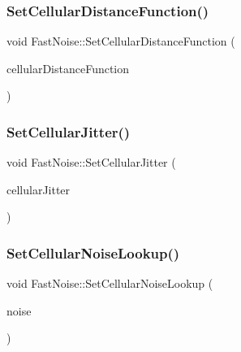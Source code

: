 \mbox{\label{class_fast_noise_aa47dea942e8c687892b5bad6d652883f}} 
\subsubsection{\texorpdfstring{Set\+Cellular\+Distance\+Function()}{SetCellularDistanceFunction()}}
{\footnotesize\ttfamily void Fast\+Noise\+::\+Set\+Cellular\+Distance\+Function (\begin{DoxyParamCaption}\item[{\mbox{\hyperlink{class_fast_noise_a457e58d0da6dbe486deb5a21a3db52bf}{Cellular\+Distance\+Function}}}]{cellular\+Distance\+Function }\end{DoxyParamCaption})\hspace{0.3cm}{\ttfamily [inline]}}

\mbox{\label{class_fast_noise_a99ea21716db492c179b4d632594a430c}} 
\subsubsection{\texorpdfstring{Set\+Cellular\+Jitter()}{SetCellularJitter()}}
{\footnotesize\ttfamily void Fast\+Noise\+::\+Set\+Cellular\+Jitter (\begin{DoxyParamCaption}\item[{\mbox{\hyperlink{_fast_noise_8h_a75a9ef6d2541c4921815b885bfd449c3}{F\+N\+\_\+\+D\+E\+C\+I\+M\+AL}}}]{cellular\+Jitter }\end{DoxyParamCaption})\hspace{0.3cm}{\ttfamily [inline]}}

\mbox{\label{class_fast_noise_a9fcbaf1407149a2caa6b1aabcf9b3db1}} 
\subsubsection{\texorpdfstring{Set\+Cellular\+Noise\+Lookup()}{SetCellularNoiseLookup()}}
{\footnotesize\ttfamily void Fast\+Noise\+::\+Set\+Cellular\+Noise\+Lookup (\begin{DoxyParamCaption}\item[{\mbox{\hyperlink{class_fast_noise}{Fast\+Noise}} $\ast$}]{noise }\end{DoxyParamCaption})\hspace{0.3cm}{\ttfamily [inline]}}

